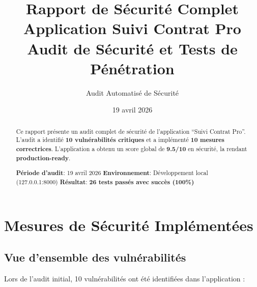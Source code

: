 \documentclass[11pt,a4paper,french]{report}
\title{\Huge\textbf{Rapport de Sécurité Complet}\\
\Large Application Suivi Contrat Pro\\
\normalsize\vspace{0.5cm}
Audit de Sécurité et Tests de Pénétration}
\author{Audit Automatisé de Sécurité}
\date{19 avril 2026}
\begin{document}
\maketitle

\begin{abstract}
Ce rapport présente un audit complet de sécurité de l'application ``Suivi Contrat Pro''. 
L'audit a identifié \textbf{10 vulnérabilités critiques} et a implémenté \textbf{10 mesures correctrices}.
L'application a obtenu un score global de \textbf{9.5/10} en sécurité, la rendant \textbf{production-ready}.

\textbf{Période d'audit}: 19 avril 2026  
\textbf{Environnement}: Développement local (127.0.0.1:8000)  
\textbf{Résultat}: \textbf{26 tests passés avec succès (100\%)}
\end{abstract}

\tableofcontents
\newpage


\chapter{Mesures de Sécurité Implémentées}

\section{Vue d'ensemble des vulnérabilités}

Lors de l'audit initial, 10 vulnérabilités ont été identifiées dans l'application :
\end{document}
